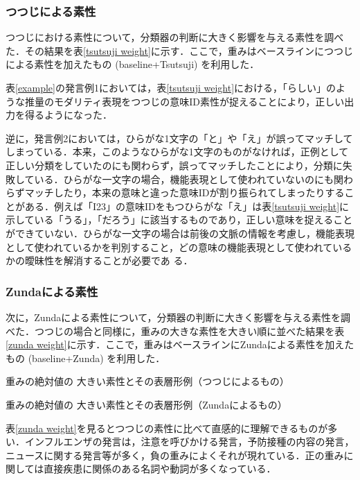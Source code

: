 \documentclass[japanese]{jnlp_1.4}
\begin{document}
\subsubsection{つつじによる素性}

つつじにおける素性について，分類器の判断に大きく影響を与える素性を調べた．その結果を表\ref{tsutsuji weight}に示す．ここで，重みはベースラインにつつじによる素性を加えたもの (baseline+Tsutsuji) を利用した．

表\ref{example}の発言例1においては，表\ref{tsutsuji weight}における，「らしい」のような推量のモダリティ表現をつつじの意味ID素性が捉えることにより，正しい出力を得るようになった．


逆に，発言例2においては，ひらがな1文字の「と」や「え」が誤ってマッチしてしまっている．本来，このようなひらがな1文字のものがなければ，正例として正しい分類をしていたのにも関わらず，誤ってマッチしたことにより，分類に失敗している．ひらがな一文字の場合，機能表現として使われていないのにも関わらずマッチしたり，本来の意味と違った意味IDが割り振られてしまったりすることがある．例えば「I23」の意味IDをもつひらがな「え」は表\ref{tsutsuji weight}に示している「うる」，「だろう」に該当するものであり，正しい意味を捉えることができていない．ひらがな一文字の場合は前後の文脈の情報を考慮し，機能表現として使われているかを判別すること，どの意味の機能表現として使われているかの曖昧性を解消することが必要であ
\linebreak
る．


\subsubsection{Zundaによる素性}

次に，Zundaによる素性について，分類器の判断に大きく影響を与える素性を調べた．つつじの場合と同様に，重みの大きな素性を大きい順に並べた結果を表\ref{zunda weight}に示す．ここで，重みはベースラインにZundaによる素性を加えたもの (baseline+Zunda) を利用した．

\begin{table}[b]
\caption{重みの絶対値の 大きい素性とその表層形例（つつじによるもの）}
\label{tsutsuji weight}

\end{table}
\begin{table}[b]
\caption{重みの絶対値の 大きい素性とその表層形例（Zundaによるもの）}
\label{zunda weight}

\end{table}

表\ref{zunda weight}を見るとつつじの素性に比べて直感的に理解できるものが多い．インフルエンザの発言は，注意を呼びかける発言，予防接種の内容の発言，ニュースに関する発言等が多く，負の重みによくそれが現れている．正の重みに関しては直接疾患に関係のある名詞や動詞が多くなっている．
\end{document}
